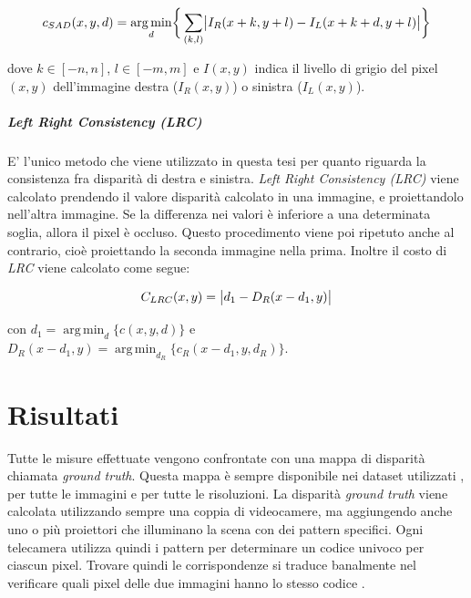 \documentclass[12pt]{report}
\DeclarePairedDelimiter{\abs}{\lvert}{\rvert}    %
\DeclareMathOperator*{\argmin}{arg\,min} %
\begin{document}
			\begin{equation}
				c_{SAD}(x,y,d)=\argmin_{d}\biggr\{\sum_{(k,l)}\abs[\big]{I_{R}(x+k,y+l) - I_{L}(x+k+d,y+l)}\biggr\}
				\label{eq:SAD}
			\end{equation}		
			
			\noindent dove $k\in[-n,n]$, $l\in[-m,m]$ e $I(x,y)$ indica il livello di grigio del pixel $(x,y)$ dell'immagine destra ($I_{R}(x,y)$) o sinistra ($I_{L}(x,y)$). 
		
		
			
			\paragraph{Left Right Consistency (LRC)}
			\label{par:LRC}
			
				E' l'unico metodo che viene utilizzato in questa tesi per quanto riguarda la consistenza fra disparità di destra e sinistra.
				\textit{Left Right Consistency (LRC)} viene calcolato prendendo il valore disparità calcolato in una immagine, e proiettandolo nell'altra immagine. Se la differenza nei valori è inferiore a una determinata soglia, allora il pixel è occluso. Questo procedimento viene poi ripetuto anche al contrario, cioè proiettando la seconda immagine nella prima. Inoltre il costo di \textit{LRC} viene calcolato come segue:
				
				\begin{equation}
					C_{LRC}(x,y)=\abs[\big]{d_{1}-D_{R}(x-d_{1},y)}
					\label{eq:LRC}
				\end{equation}	
				
				\noindent con $d_{1}=\argmin_{d}\bigr\{c(x,y,d)\bigr\}$ e $D_{R}(x-d_{1},y)=\argmin_{d_{R}}\bigr\{c_{R}(x-d_{1},y,d_{R})\bigr\}$.
				
				

	\chapter{Risultati}
	\label{sec:risultati}
	\pagestyle{fancy}				
	
		Tutte le misure effettuate vengono confrontate con una mappa di disparità chiamata \textit{ground truth}. Questa mappa è sempre disponibile nei dataset utilizzati \cite{dataset_2006_1, dataset_2006_2}, per tutte le immagini e per tutte le risoluzioni. La disparità \textit{ground truth} viene calcolata utilizzando sempre una coppia di videocamere, ma aggiungendo anche uno o più proiettori che illuminano la scena con dei pattern specifici. Ogni telecamera utilizza quindi i pattern per determinare un codice univoco per ciascun pixel. Trovare quindi le corrispondenze si traduce banalmente nel verificare quali pixel delle due immagini hanno lo stesso codice \cite{ground_truth}.  			
		
\end{document}
